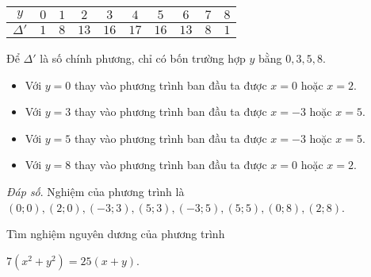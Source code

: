 \begin{bt}
{\begin{enumerate}
\begin{center}
    \setlength{\tabcolsep}{18pt}
    \begin{tabular}{| c | c| c |c|c|c|c|c| c|c|}
                 \hline 
                 $y$ & $0$   &  $1$ & $2$ & $3$ &$4$ &$5$&$6$&$7$&$8$   \\ 
                  \hline 
                 $\Delta'$ & $1$   &  $8$ & $13$   &  $16$&$17$&$16$&$13$&$8$&$1$ \\
                  \hline 
                 \end{tabular}            
    \end{center}
    Để $\Delta'$ là số chính phương, chỉ có bốn trường hợp $y$ bằng $0,3,5,8$.
    \begin{itemize}
    \item Với $y=0$ thay vào phương trình ban đầu ta được $x=0$ hoặc $x=2$.
     \item Với $y=3$ thay vào phương trình ban đầu ta được $x=-3$ hoặc $x=5$.
      \item Với $y=5$ thay vào phương trình ban đầu ta được $x=-3$ hoặc $x=5$.
       \item Với $y=8$ thay vào phương trình ban đầu ta được $x=0$ hoặc $x=2$.
\end{itemize}    

\textit{Đáp số}. Nghiệm của phương trình là $(0;0),(2;0),(-3;3),(5;3),(-3;5),(5;5),(0;8),(2;8)$.
    \end{enumerate}     

  }
\end{bt}
\begin{bt}%
    Tìm nghiệm nguyên dương của phương trình
    \begin{center}
    $7\left(x^2+y^2\right)=25\left(x+y\right)$.
    \end{center}
\end{bt}
